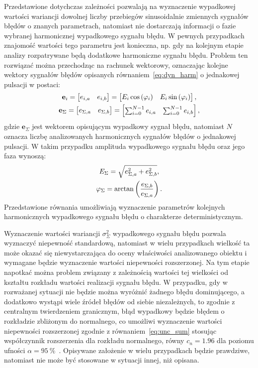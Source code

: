 Przedstawione dotychczas zależności pozwalają na wyznaczenie wypadkowej wartości wariancji dowolnej liczby przebiegów sinusoidalnie zmiennych sygnałów błędów o znanych parametrach, natomiast nie dostarczają informacji o fazie wybranej harmonicznej wypadkowego sygnału błędu. W pewnych przypadkach znajomość wartości tego parametru jest konieczna, np. gdy na kolejnym etapie analizy rozpatrywane będą dodatkowe harmoniczne sygnału błędu. Problem ten rozwiązać można przechodząc na rachunek wektorowy, oznaczając kolejne wektory sygnałów błędów opisanych równaniem~\eqref{eq:dyn_harm} o jednakowej pulsacji w postaci:
\begin{gather}
\mathbf{e}_{i} =
\begin{bmatrix}
e_{i,a} & e_{i,b}
\end{bmatrix}
=
\begin{bmatrix}
E_{i} \cos \left(\varphi_{i}\right) & E_{i} \sin \left(\varphi_{i}\right)
\end{bmatrix}
\label{eq:dyn_vect}, \\
\mathbf{e}_{\Sigma} =
\begin{bmatrix}
e_{\Sigma,a} & e_{\Sigma,b}
\end{bmatrix}
=
\begin{bmatrix}
\sum _{i = 0} ^{N-1} e_{i,a} & \sum _{i = 0} ^{N-1} e_{i,b}
\end{bmatrix}
\label{eq:dyn_vect_sum},
\end{gather}
gdzie $\mathbf{e}_{\Sigma}$ jest wektorem opisującym wypadkowy sygnał błędu, natomiast $N$ oznacza liczbę analizowanych harmonicznych sygnałów błędów o jednakowej pulsacji. W takim przypadku amplituda wypadkowego sygnału błędu oraz jego faza wynoszą:
\begin{gather}
E_{\Sigma} = \sqrt{e_{\Sigma,a}^{2} + e_{\Sigma,b}^{2}} \label{eq:dyn_vect_amp}, \\
\varphi_{\Sigma} = \arctan \left(\frac{e_{\Sigma,b}}{e_{\Sigma,a}}\right) \label{eq:dyn_vect_phi}.
\end{gather}
Przedstawione równania umożliwiają wyznaczenie parametrów kolejnych harmonicznych wypadkowego sygnału błędu o charakterze deterministycznym.

Wyznaczenie wartości wariancji $\sigma_{\Sigma}^{2}$ wypadkowego sygnału błędu pozwala wyznaczyć niepewność standardową, natomiast w wielu przypadkach wielkość ta może okazać się niewystarczająca do oceny właściwości analizowanego obiektu i wymagane będzie wyznaczenie wartości niepewności rozszerzonej. Na tym etapie napotkać można problem związany z zależnością wartości tej wielkości od kształtu rozkładu wartości realizacji sygnału błędu. W przypadku, gdy w rozważanej sytuacji nie będzie można wyróżnić żadnego błędu dominującego, a dodatkowo wystąpi wiele źródeł błędów od siebie niezależnych, to zgodnie z centralnym twierdzeniem granicznym, błąd wypadkowy będzie błędem o rozkładzie zbliżonym do normalnego, co umożliwi wyznaczenie wartości niepewności rozszerzonej zgodnie z równaniem~\eqref{eq:unc_sum} stosując współczynnik rozszerzenia dla rozkładu normalnego, równy $c_{n} = \num{1.96}$ dla poziomu ufności $\alpha = \qty{95}{\percent}$~\cite{jcgm_guide}. Opisywane założenie w wielu przypadkach będzie prawdziwe, natomiast nie może być stosowane w sytuacji innej, niż opisana.

